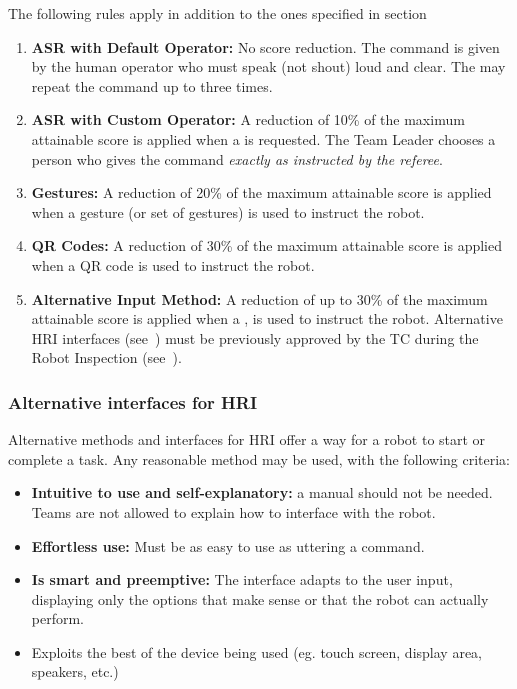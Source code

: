 The following rules apply in addition to the ones specified in section 
\begin{enumerate}
	\item \textbf{ASR with Default Operator:} No score reduction.
	The command is given by the human operator who must speak (not shout) loud and clear.
	The  may repeat the command up to three times.

	\item \textbf{ASR with Custom Operator:} A reduction of 10\% of the maximum attainable score is applied when a  is requested.
	The Team Leader chooses a person who gives the command \emph{exactly as instructed by the referee}.

	\item \textbf{Gestures:} A reduction of 20\% of the maximum attainable score is applied when a gesture (or set of gestures) is used to instruct the robot.

	\item \textbf{QR Codes:} A reduction of 30\% of the maximum attainable score is applied when a QR code is used to instruct the robot.

	\item \textbf{Alternative Input Method:} A reduction of up to 30\% of the maximum attainable score is applied when a , is used to instruct the robot.
	Alternative HRI interfaces (see~) must be previously approved by the TC during the Robot Inspection (see~).
\end{enumerate}


\subsubsection{Alternative interfaces for HRI}\label{rule:asralternative}
Alternative methods and interfaces for HRI offer a way for a robot to start or complete a task.
Any reasonable method may be used, with the following criteria:
\begin{itemize}
	\item \textbf{Intuitive to use and self-explanatory:} a manual should not be needed. Teams are not allowed to explain how to interface with the robot. %

	\item \textbf{Effortless use:} Must be as easy to use as uttering a command. %

	\item \textbf{Is smart and preemptive:} The interface adapts to the user input, displaying only the options that make sense or that the robot can actually perform.

	\item Exploits the best of the device being used (eg. touch screen, display area, speakers, etc.)
\end{itemize}

